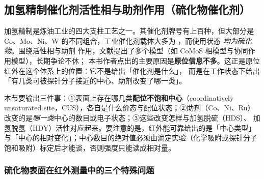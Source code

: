 
\subsection{加氢精制催化剂活性相与助剂作用（硫化物催化剂）}
\label{sec:ch07c-sulfide}

加氢精制是炼油工业的四大支柱工艺之一。其催化剂牌号有上百种，但大部分是
Co、Mo、Ni、W 的不同组合，工业催化剂载体大多为 ，而使用状态
\emph{均为硫化物}。围绕活性相与助剂
作用，文献提出了多个模型（如 CoMoS 相模型与协同作用模型），长期争论不休；
本书作者点出的主要原因是\textbf{原位信息不多}。这正是原位红外在这个体系上的位置：它不是给出「催化剂是什么」，
而是在工作状态下给出「有几类可被探针分子接近的中心、助剂改变了哪一类」。

\begin{probout}
本节要输出三件事：①表面上存在哪几类\textbf{配位不饱和中心}（coordinatively
unsaturated site，CUS），各自是什么价态与配位状态；②助剂（Co、Ni、Ru）
改变的是\emph{哪一类}中心的数目或电子状态；③这些改变怎样与加氢脱硫（HDS）、
加氢脱氢（HDY）活性对应起来。要注意的是，红外能可靠给出的是「中心类型」
与「中心的相对变化」；中心数目的绝对值必须由滴定实验（化学吸附或探针分子
饱和吸附）标定后才能谈，否则强度只能读成相对量。
\end{probout}

\subsubsection{硫化物表面在红外测量中的三个特殊问题}

